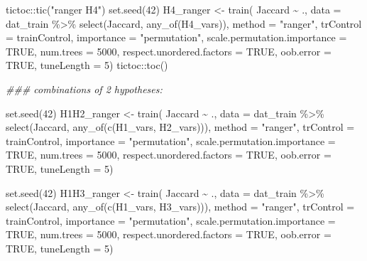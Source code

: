 \documentclass[
  letterpaper,
  DIV=11,
  numbers=noendperiod]{scrreprt}
\newenvironment{Shaded}{\begin{snugshade}}{\end{snugshade}}
\newcommand{\AttributeTok}[1]{\textcolor[rgb]{0.40,0.45,0.13}{#1}}
\newcommand{\ConstantTok}[1]{\textcolor[rgb]{0.56,0.35,0.01}{#1}}
\newcommand{\DecValTok}[1]{\textcolor[rgb]{0.68,0.00,0.00}{#1}}
\newcommand{\DocumentationTok}[1]{\textcolor[rgb]{0.37,0.37,0.37}{\textit{#1}}}
\newcommand{\FunctionTok}[1]{\textcolor[rgb]{0.28,0.35,0.67}{#1}}
\newcommand{\NormalTok}[1]{\textcolor[rgb]{0.00,0.23,0.31}{#1}}
\newcommand{\OtherTok}[1]{\textcolor[rgb]{0.00,0.23,0.31}{#1}}
\newcommand{\SpecialCharTok}[1]{\textcolor[rgb]{0.37,0.37,0.37}{#1}}
\newcommand{\StringTok}[1]{\textcolor[rgb]{0.13,0.47,0.30}{#1}}
\begin{document}
\begin{Shaded}
\begin{Highlighting}[]
\NormalTok{tictoc}\SpecialCharTok{::}\FunctionTok{tic}\NormalTok{(}\StringTok{"ranger H4"}\NormalTok{)}
\FunctionTok{set.seed}\NormalTok{(}\DecValTok{42}\NormalTok{)}
\NormalTok{H4\_ranger }\OtherTok{\textless{}{-}} \FunctionTok{train}\NormalTok{(}
\NormalTok{    Jaccard }\SpecialCharTok{\textasciitilde{}}\NormalTok{ .,}
    \AttributeTok{data =}\NormalTok{ dat\_train }\SpecialCharTok{\%\textgreater{}\%} \FunctionTok{select}\NormalTok{(Jaccard, }\FunctionTok{any\_of}\NormalTok{(H4\_vars)),}
    \AttributeTok{method =} \StringTok{"ranger"}\NormalTok{,}
    \AttributeTok{trControl =}\NormalTok{ trainControl,}
    \AttributeTok{importance =} \StringTok{"permutation"}\NormalTok{,}
    \AttributeTok{scale.permutation.importance =} \ConstantTok{TRUE}\NormalTok{,}
    \AttributeTok{num.trees =} \DecValTok{5000}\NormalTok{,}
    \AttributeTok{respect.unordered.factors =} \ConstantTok{TRUE}\NormalTok{,}
    \AttributeTok{oob.error =} \ConstantTok{TRUE}\NormalTok{,}
    \AttributeTok{tuneLength =} \DecValTok{5}\NormalTok{)}
\NormalTok{tictoc}\SpecialCharTok{::}\FunctionTok{toc}\NormalTok{()}


\DocumentationTok{\#\#\# combinations of 2 hypotheses:}

\FunctionTok{set.seed}\NormalTok{(}\DecValTok{42}\NormalTok{)}
\NormalTok{H1H2\_ranger }\OtherTok{\textless{}{-}} \FunctionTok{train}\NormalTok{(}
\NormalTok{    Jaccard }\SpecialCharTok{\textasciitilde{}}\NormalTok{ .,}
    \AttributeTok{data =}\NormalTok{ dat\_train }\SpecialCharTok{\%\textgreater{}\%} \FunctionTok{select}\NormalTok{(Jaccard, }\FunctionTok{any\_of}\NormalTok{(}\FunctionTok{c}\NormalTok{(H1\_vars, H2\_vars))),}
    \AttributeTok{method =} \StringTok{"ranger"}\NormalTok{,}
    \AttributeTok{trControl =}\NormalTok{ trainControl,}
    \AttributeTok{importance =} \StringTok{"permutation"}\NormalTok{,}
    \AttributeTok{scale.permutation.importance =} \ConstantTok{TRUE}\NormalTok{,}
    \AttributeTok{num.trees =} \DecValTok{5000}\NormalTok{,}
    \AttributeTok{respect.unordered.factors =} \ConstantTok{TRUE}\NormalTok{,}
    \AttributeTok{oob.error =} \ConstantTok{TRUE}\NormalTok{,}
    \AttributeTok{tuneLength =} \DecValTok{5}\NormalTok{)}

\FunctionTok{set.seed}\NormalTok{(}\DecValTok{42}\NormalTok{)}
\NormalTok{H1H3\_ranger }\OtherTok{\textless{}{-}} \FunctionTok{train}\NormalTok{(}
\NormalTok{    Jaccard }\SpecialCharTok{\textasciitilde{}}\NormalTok{ .,}
    \AttributeTok{data =}\NormalTok{ dat\_train }\SpecialCharTok{\%\textgreater{}\%} \FunctionTok{select}\NormalTok{(Jaccard, }\FunctionTok{any\_of}\NormalTok{(}\FunctionTok{c}\NormalTok{(H1\_vars, H3\_vars))),}
    \AttributeTok{method =} \StringTok{"ranger"}\NormalTok{,}
    \AttributeTok{trControl =}\NormalTok{ trainControl,}
    \AttributeTok{importance =} \StringTok{"permutation"}\NormalTok{,}
    \AttributeTok{scale.permutation.importance =} \ConstantTok{TRUE}\NormalTok{,}
    \AttributeTok{num.trees =} \DecValTok{5000}\NormalTok{,}
    \AttributeTok{respect.unordered.factors =} \ConstantTok{TRUE}\NormalTok{,}
    \AttributeTok{oob.error =} \ConstantTok{TRUE}\NormalTok{,}
    \AttributeTok{tuneLength =} \DecValTok{5}\NormalTok{)}


\end{Highlighting}
\end{Shaded}
\end{document}
